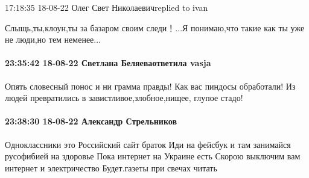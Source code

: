  
 
 
 
 

17:18:35 18-08-22
Олег Свет Николаевичreplied to ivan

Слыщь,ты,клоун,ты за базаром своим следи！...Я понимаю,что такие как ты уже не люди,но тем неменее...

\paragraph{23:35:42 18-08-22 Светлана Беляеваответила vasja}

Опять словесный понос и ни грамма правды! Как вас пиндосы обработали! Из людей
превратились в завистливое,злобное,нищее, глупое стадо!

\paragraph{23:38:30 18-08-22 Александр Стрельников}

Одноклассники это Российский сайт браток Иди на фейсбук и там занимайся
русофибией на здоровье Пока интернет на Украине есть Скорою выключим вам
интернет и электричество Будет.газеты при свечах читать
